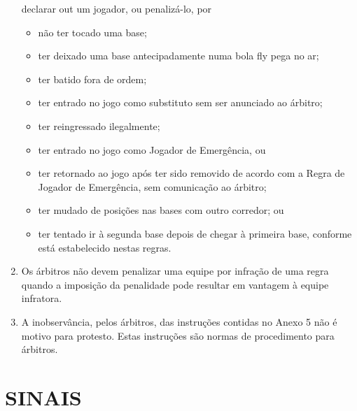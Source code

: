 \begin{enumerate}[label=(\alph*)]
 declarar \gls{out} um jogador, ou
  penalizá-lo, por
  \begin{itemize}
  	\item não ter tocado uma base;
  	\item ter deixado uma base antecipadamente numa bola \gls{fly} pega no ar;
  	\item ter batido fora de ordem;
	\item ter entrado no jogo como substituto sem ser anunciado ao árbitro;
	\item ter reingressado ilegalmente;
	\item ter entrado no jogo como Jogador de Emergência, ou
	\item ter retornado ao jogo após ter sido removido de acordo com a Regra de Jogador de Emergência, sem comunicação ao árbitro;
	\item ter mudado de posições nas bases com outro corredor; ou
	\item ter tentado ir à segunda base depois de chegar à primeira base, conforme está estabelecido nestas regras.
  \end{itemize}

\item   Os árbitros não devem penalizar uma equipe por infração de uma regra quando a imposição da penalidade pode resultar em vantagem à equipe infratora.
\item  A inobservância, pelos árbitros, das instruções contidas no Anexo 5 não é motivo para protesto. Estas instruções são normas de procedimento para árbitros.
\end{enumerate}

\section{SINAIS}

